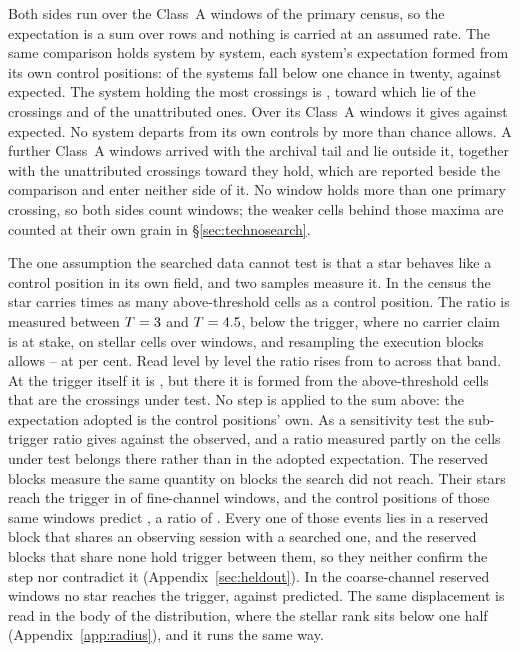 Both sides run over the \CeNWin{} Class~A windows of the primary census, so
the expectation is a sum over rows and nothing is carried at an assumed rate.
The same comparison holds system by system, each system's expectation formed
from its own control positions: \MtNSysLowP{} of the \MtNSysChance{} systems
fall below one chance in twenty, against \MtNSysLowPExp{} expected. The system
holding the most crossings is \MtTopStar, toward which lie
\MtTopStarNCross{} of the \EvNCrossRaw{} crossings and \MtTopStarNUnattr{} of
the unattributed ones. Over its \MtTopSysNWin{} Class~A windows it gives
\MtTopSysObs{} against \MtTopSysExp{} expected. No system departs from its
own controls by more than chance allows.
A further \CeNWinTail{} Class~A windows arrived with the archival tail and lie
outside it, together with the \CeNTailCrossWord{} unattributed crossings
toward \CeTailStar{} they hold, which are reported beside the comparison and
enter neither side of it. No window holds more than one primary crossing, so
both sides count windows; the weaker cells behind those maxima are counted at
their own grain in \S\ref{sec:technosearch}.

The one assumption the searched data cannot test is that a star behaves like
a control position in its own field, and two samples measure it. In the census
the star carries \CeStep{} times as many above-threshold cells as a control
position. The ratio is measured between $T=3$ and
$T=4.5$, below the trigger, where no carrier claim is at stake, on
\CeStepNStar{} stellar cells over \CeStepNWin{} windows, and resampling the
execution blocks allows \CeStepLo--\CeStepHi{} at \CeCovPct{} per cent.
Read level by level the ratio rises from \CkRatioLo{} to \CkRatioHi{}
across that band. At the trigger itself it is \CeTrAt, but there it is formed
from the \CeStepNX{} above-threshold cells that are the crossings under test.
No step is applied to the sum above: the expectation adopted is the control
positions' own. As a sensitivity test the sub-trigger ratio gives \CeExpX{}
against the \CeObs{} observed, and a ratio measured partly on the cells under
test belongs there rather than in the adopted expectation. The reserved blocks measure
the same quantity on blocks the search did not reach. Their stars reach the
trigger in \StHoObs{} of \StHoNFine{} fine-channel windows, and the control
positions of those same windows predict \StHoExpFine, a ratio of
\StHoRatio. Every one of those
events lies in a reserved block that shares an observing session with a
searched one, and the \HsIndBlocks{} reserved blocks that share none hold
\HsIndObsWord{} trigger \HsIndObsNoun{} between them, so they neither confirm
the step nor contradict it (Appendix~\ref{sec:heldout}). In the \StHoNCoarse{} coarse-channel
reserved windows no star reaches the trigger, against \StHoExpCoarse{}
predicted. The same displacement is read in the body of the distribution,
where the stellar rank sits below one half (Appendix~\ref{app:radius}), and it
runs the same way.

